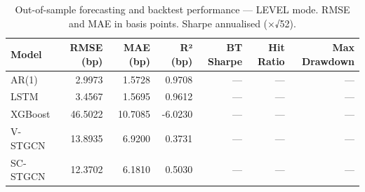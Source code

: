 \begin{table}
\caption{Out-of-sample forecasting and backtest performance — LEVEL mode. RMSE and MAE in basis points. Sharpe annualised (×√52).}
\label{tab:results_level}
\begin{tabular}{lrrrrrr}
\toprule
Model & RMSE (bp) & MAE (bp) & R² (bp) & BT Sharpe & Hit Ratio & Max Drawdown \\
\midrule
AR(1) & 2.9973 & 1.5728 & 0.9708 & — & — & — \\
LSTM & 3.4567 & 1.5695 & 0.9612 & — & — & — \\
XGBoost & 46.5022 & 10.7085 & -6.0230 & — & — & — \\
V-STGCN & 13.8935 & 6.9200 & 0.3731 & — & — & — \\
SC-STGCN & 12.3702 & 6.1810 & 0.5030 & — & — & — \\
\bottomrule
\end{tabular}
\end{table}
